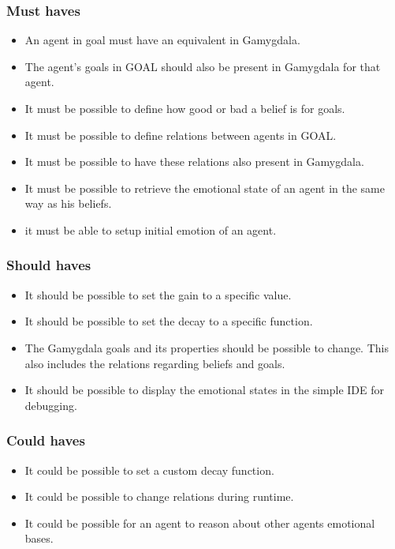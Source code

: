\documentclass[]{article}
\begin{document}
\subsubsection*{Must haves}
\begin{itemize}
	\item An \gls{agent} in goal must have an equivalent in Gamygdala.
	\item The agent's goals in GOAL should also be present in Gamygdala for that agent. 
	\item It must be possible to define how good or bad a belief is for goals.
	\item It must be possible to define relations between agents in GOAL.
	\item It must be possible to have these relations also present in Gamygdala.
	\item It must be possible to retrieve the emotional state of an agent in the same way as his beliefs.
	\item it must be able to setup initial emotion of an agent.
\end{itemize}
 
\subsubsection*{Should haves}

\begin{itemize}
	\item It should be possible to set the gain to a specific value.
	\item It should be possible to set the decay to a specific function.
	\item The  Gamygdala goals and its properties should be possible to change. This also includes the relations regarding beliefs and goals.
	\item It should be possible to display the emotional states in the simple IDE for debugging.
\end{itemize}


\subsubsection*{Could haves}

\begin{itemize}
	\item It could be possible to set a custom decay function.
	\item It could be possible to change relations during runtime.
	
	\item It could be possible for an agent to reason about other agents emotional bases.
\end{itemize}
\end{document}

